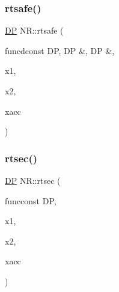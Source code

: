 \subsubsection{\texorpdfstring{rtsafe()}{rtsafe()}}
{\footnotesize\ttfamily \mbox{\hyperlink{namespaceNR_af6ff762dd605ff477b8e52387253a02a}{DP}} N\+R\+::rtsafe (\begin{DoxyParamCaption}\item[{void }]{funcdconst D\+P, D\+P \&, D\+P \&,  }\item[{const \mbox{\hyperlink{namespaceNR_af6ff762dd605ff477b8e52387253a02a}{DP}}}]{x1,  }\item[{const \mbox{\hyperlink{namespaceNR_af6ff762dd605ff477b8e52387253a02a}{DP}}}]{x2,  }\item[{const \mbox{\hyperlink{namespaceNR_af6ff762dd605ff477b8e52387253a02a}{DP}}}]{xacc }\end{DoxyParamCaption})}

\mbox{\label{namespaceNR_a605de556663dbd83b38d1ca358125af1}} 
\subsubsection{\texorpdfstring{rtsec()}{rtsec()}}
{\footnotesize\ttfamily \mbox{\hyperlink{namespaceNR_af6ff762dd605ff477b8e52387253a02a}{DP}} N\+R\+::rtsec (\begin{DoxyParamCaption}\item[{\mbox{\hyperlink{namespaceNR_af6ff762dd605ff477b8e52387253a02a}{DP}} }]{funcconst DP,  }\item[{const \mbox{\hyperlink{namespaceNR_af6ff762dd605ff477b8e52387253a02a}{DP}}}]{x1,  }\item[{const \mbox{\hyperlink{namespaceNR_af6ff762dd605ff477b8e52387253a02a}{DP}}}]{x2,  }\item[{const \mbox{\hyperlink{namespaceNR_af6ff762dd605ff477b8e52387253a02a}{DP}}}]{xacc }\end{DoxyParamCaption})}

\mbox{\label{namespaceNR_a17af9084521630603977a8c9bd46bd40}} 
